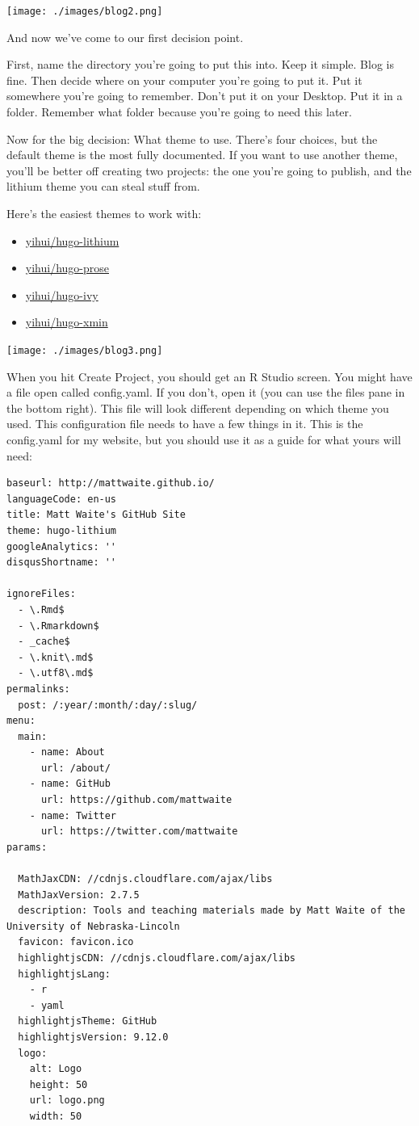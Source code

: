 \documentclass[
  letterpaper,
  DIV=11,
  numbers=noendperiod]{scrreprt}
\providecommand{\tightlist}{%
  \setlength{\itemsep}{0pt}\setlength{\parskip}{0pt}}\usepackage{longtable,booktabs,array}
\begin{document}
\texttt{[image: ./images/blog2.png]}

And now we've come to our first decision point.

First, name the directory you're going to put this into. Keep it simple.
Blog is fine. Then decide where on your computer you're going to put it.
Put it somewhere you're going to remember. Don't put it on your Desktop.
Put it in a folder. Remember what folder because you're going to need
this later.

Now for the big decision: What theme to use. There's four choices, but
the default theme is the most fully documented. If you want to use
another theme, you'll be better off creating two projects: the one
you're going to publish, and the lithium theme you can steal stuff from.

Here's the easiest themes to work with:

\begin{itemize}
\tightlist
\item
  \href{https://GitHub.com/yihui/hugo-lithium}{yihui/hugo-lithium}
\item
  \href{https://GitHub.com/yihui/hugo-prose}{yihui/hugo-prose}
\item
  \href{https://GitHub.com/yihui/hugo-ivy}{yihui/hugo-ivy}
\item
  \href{https://GitHub.com/yihui/hugo-xmin}{yihui/hugo-xmin}
\end{itemize}

\texttt{[image: ./images/blog3.png]}

When you hit Create Project, you should get an R Studio screen. You
might have a file open called config.yaml. If you don't, open it (you
can use the files pane in the bottom right). This file will look
different depending on which theme you used. This configuration file
needs to have a few things in it. This is the config.yaml for my
website, but you should use it as a guide for what yours will need:

\begin{verbatim}
baseurl: http://mattwaite.github.io/
languageCode: en-us
title: Matt Waite's GitHub Site
theme: hugo-lithium
googleAnalytics: ''
disqusShortname: ''

ignoreFiles:
  - \.Rmd$
  - \.Rmarkdown$
  - _cache$
  - \.knit\.md$
  - \.utf8\.md$
permalinks:
  post: /:year/:month/:day/:slug/
menu:
  main:
    - name: About
      url: /about/
    - name: GitHub
      url: https://github.com/mattwaite
    - name: Twitter
      url: https://twitter.com/mattwaite
params:
  
  MathJaxCDN: //cdnjs.cloudflare.com/ajax/libs
  MathJaxVersion: 2.7.5
  description: Tools and teaching materials made by Matt Waite of the University of Nebraska-Lincoln
  favicon: favicon.ico
  highlightjsCDN: //cdnjs.cloudflare.com/ajax/libs
  highlightjsLang:
    - r
    - yaml
  highlightjsTheme: GitHub
  highlightjsVersion: 9.12.0
  logo:
    alt: Logo
    height: 50
    url: logo.png
    width: 50
\end{verbatim}
\end{document}
